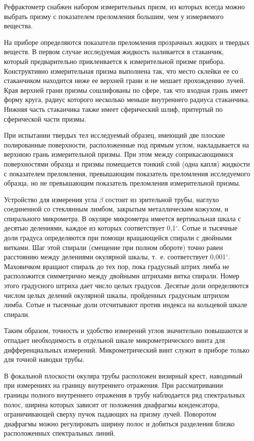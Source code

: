 Рефрактометр снабжен
набором измерительных призм, из которых всегда можно выбрать
призму с показателем преломления большим, чем у измеряемого
вещества.

На приборе определяются показатели преломления прозрачных жидких и
твердых веществ. В первом случае исследуемая жидкость наливается в
стаканчик, который предварительно приклеивается к измерительной
призме прибора. Конструктивно измерительная призма выполнена так,
что место склейки ее со стаканчиком находится ниже ее верхней
грани и не мешает прохождению лучей. Края верхней грани призмы
сошлифованы по сфере, так что входная грань имеет форму круга,
радиус которого несколько меньше внутреннего радиуса стаканчика.
Нижняя часть стаканчика также имеет сферический шлиф, притертый по
сферической части призмы.

При испытании твердых тел исследуемый образец, имеющий две плоские
полированные поверхности, расположенные под прямым углом,
накладывается на верхнюю грань измерительной призмы. При этом
между соприкасающимися поверхностями образца и призмы помещается
тонкий слой (одна капля) жидкости с показателем преломления,
превышающим показатель преломления исследуемого образца, но не
превышающим показатель преломления измерительной призмы.

Устройство для измерения угла $\beta$ состоит из зрительной трубы,
наглухо соединенной со стеклянным лимбом, закрытым металлическим
кожухом, и спирального микрометра. В окуляре микрометра имеется
вертикальная шкала с десятью делениями, каждое из которых
соответствует 0,1$^{\circ}$. Сотые и тысячные доли градуса
определяются при помощи вращающейся спирали с двойными витками.
Шаг этой спирали (смещение при полном обороте) точно равен
расстоянию между делениями окулярной шкалы, т.~е. соответствует
0,001$^{\circ}$. Маховичком вращают спираль до тех пор, пока
градусный штрих лимба не расположится симметрично между двойными
штрихами витка спирали. Номер этого градусного штриха дает число
целых градусов. Десятые доли определяются числом целых делений
окулярной шкалы, пройденных градусным штрихом лимба. Сотые и
тысячные доли отсчитывают против индекса на кольцевой шкале
спирали.

Таким образом, точность и удобство измерений углов значительно
повышаются и отпадает необходимость в отдельной шкале
микрометрического винта для дифференциальных измерений.
Микрометрический винт служит в приборе только для точной наводки
трубы.

В фокальной плоскости окуляра трубы расположен визирный крест,
наводимый при измерениях на границу внутреннего отражения. При
рассматривании границы полного внутреннего отражения в трубу
наблюдается ряд спектральных полос, ширина которых зависит от
положения диафрагмы конденсатора, ограничивающей сверху пучок
падающих на призму лучей. Поворотом диафрагмы можно регулировать
ширину полос и добиться разделения близко расположенных
спектральных линий.

